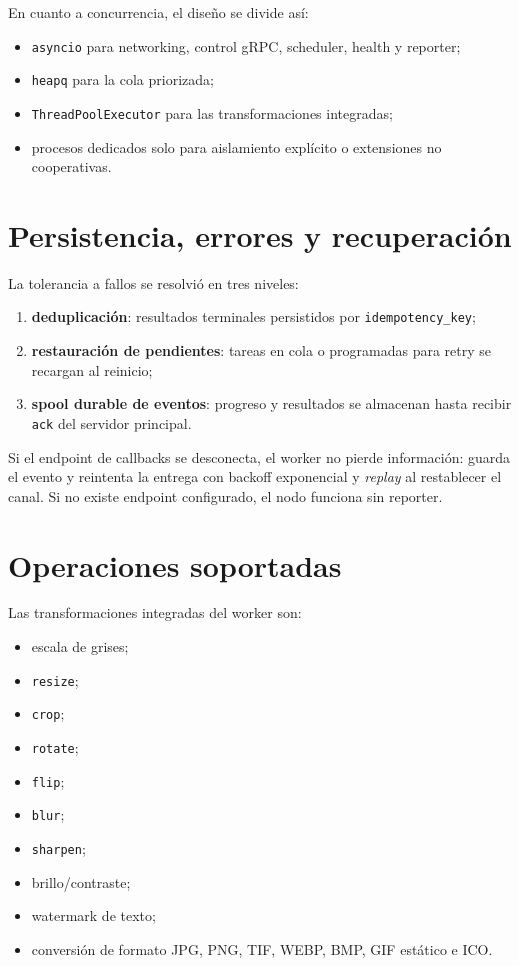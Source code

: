 \documentclass[conference]{IEEEtran}
\begin{document}
En cuanto a concurrencia, el diseño se divide así:
\begin{itemize}[leftmargin=*]
\item \texttt{asyncio} para networking, control gRPC, scheduler, health y reporter;
\item \texttt{heapq} para la cola priorizada;
\item \texttt{ThreadPoolExecutor} para las transformaciones integradas;
\item procesos dedicados solo para aislamiento explícito o extensiones no cooperativas.
\end{itemize}

\section{Persistencia, errores y recuperación}
La tolerancia a fallos se resolvió en tres niveles:
\begin{enumerate}[leftmargin=*]
\item \textbf{deduplicación}: resultados terminales persistidos por \texttt{idempotency\_key};
\item \textbf{restauración de pendientes}: tareas en cola o programadas para retry se recargan al reinicio;
\item \textbf{spool durable de eventos}: progreso y resultados se almacenan hasta recibir \texttt{ack} del servidor principal.
\end{enumerate}

Si el endpoint de callbacks se desconecta, el worker no pierde información: guarda el evento y reintenta la entrega con backoff exponencial y \emph{replay} al restablecer el canal. Si no existe endpoint configurado, el nodo funciona sin reporter.

\section{Operaciones soportadas}
Las transformaciones integradas del worker son:
\begin{itemize}[leftmargin=*]
\item escala de grises;
\item \texttt{resize};
\item \texttt{crop};
\item \texttt{rotate};
\item \texttt{flip};
\item \texttt{blur};
\item \texttt{sharpen};
\item brillo/contraste;
\item watermark de texto;
\item conversión de formato JPG, PNG, TIF, WEBP, BMP, GIF estático e ICO.
\end{itemize}
\end{document}
